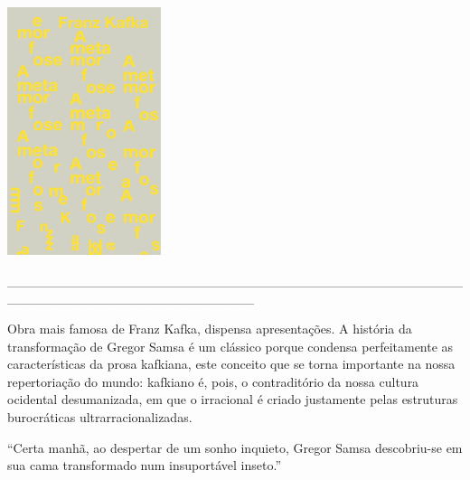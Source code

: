 \pagestyle{hedra}
\label{hedra}

%
%
\hspace{.5cm}

\begin{center}
\hspace*{-2.5cm}
\hspace{2cm}\includegraphics[width=45mm]{./imgs/kafka.png}
\end{center}

\hspace*{-2cm}\_\_\_\_\_\_\_\_\_\_\_\_\_\_\_\_\_\_\_\_\_\_\_\_\_\_\_\_\_\_\_\_\_\_\_\_\_\_\_\_\_\_\_\_\_\_\_\_\_\_\_\_\_\_\_\_\_\_\_\_\_\_\_\_\_\_\_\_\_\_\_\_\_\_

\medskip

\noindent{}Obra mais famosa de Franz Kafka, {} dispensa apresentações. A história da transformação de Gregor Samsa é um clássico porque condensa perfeitamente as características da prosa kafkiana, este conceito que se torna importante na nossa repertoriação do mundo: kafkiano é, pois, o contraditório da nossa cultura ocidental desumanizada, em que o irracional é criado justamente pelas estruturas burocráticas ultrarracionalizadas.

\hspace{.5cm}

\hspace*{-.4cm}\begin{minipage}[c]{0.45\linewidth}
\small{
{}}
\end{minipage}
\begin{minipage}[c]{0.50\linewidth}
\small{``Certa manhã, ao despertar de um sonho inquieto, Gregor Samsa descobriu-se em sua cama transformado num insuportável inseto.''} 
\end{minipage}

